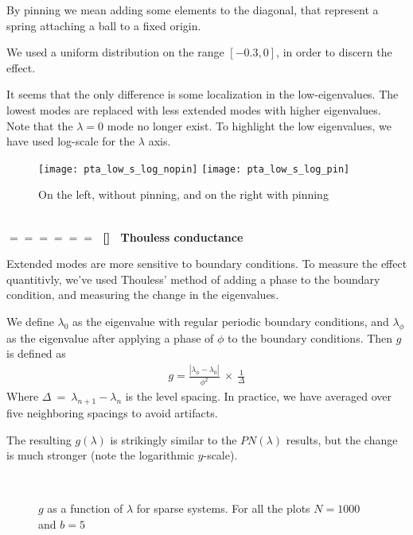 \documentclass[onecolumn,fleqn]{revtex4}
\newcommand{\sect}[1]
{
\addtocounter{section}{1} 
\setcounter{subsection}{0}
\ \\ 
\pdfbookmark[2]{\thesection. \ #1}{sect.\thesection}
{\Large\bf $=\!=\!=\!=\!=\!=\;$ [\thesection] \ #1}  
\nopagebreak
}
\begin{document}
By pinning we mean adding some elements to the diagonal,
that represent a spring attaching a ball to a fixed origin.


We used a uniform distribution on the range $[-0.3,0]$,
in order to discern the effect.


It seems that the only difference is some localization in
the low-eigenvalues. The lowest modes are replaced with less 
extended modes with higher eigenvalues. Note that the $\lambda=0$ mode no longer
exist. To highlight the low eigenvalues,
we have used log-scale for the $\lambda$ axis.

\begin{figure}[H]
\texttt{[image: pta\_low\_s\_log\_nopin]}
\texttt{[image: pta\_low\_s\_log\_pin]}
\caption{On the left, without pinning, and on the right with pinning}
\end{figure}


 
\sect{Thouless conductance}

Extended modes are more sensitive to boundary conditions. To measure
the effect quantitivly, we've used Thouless' method of adding
a phase to the boundary condition, and measuring the change in the eigenvalues.

We define $\lambda_0$ as the eigenvalue with regular periodic boundary conditions,
and $\lambda_\phi$ as the eigenvalue after applying a phase of $\phi$ to the boundary conditions.
Then $g$ is defined as
%
\begin{align}
  g = \frac{|\lambda_\phi - \lambda_0 |}{\phi^2}\ \times \ \frac{1}{\Delta}
\end{align}
%
Where $\Delta\ =\ \lambda_{n+1}-\lambda_n$ is the level spacing. 
In practice, we have averaged over five 
neighboring spacings to avoid artifacts.


The resulting $g(\lambda)$ is strikingly similar to the $PN(\lambda)$ results,
but the change is much stronger (note the logarithmic $y$-scale).  


\begin{figure}[H]
  \\
  \caption{$g$ as a function of $\lambda$ for sparse systems.
  For all the plots $N=1000$ and $b=5$}
\end{figure}
\end{document}
